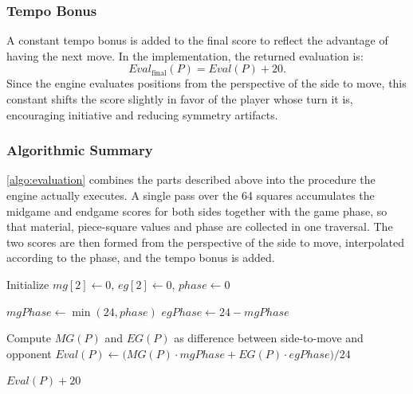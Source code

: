 \subsubsection{Tempo Bonus}
\label{subsec:tempo_bonus}

A constant tempo bonus is added to the final score to reflect the advantage of
having the next move. In the implementation, the returned evaluation is:
\[
Eval_\text{final}(P) = Eval(P) + 20.
\]
Since the engine evaluates positions from the perspective of the side to move,
this constant shifts the score slightly in favor of the player whose turn it is,
encouraging initiative and reducing symmetry artifacts.

\subsubsection{Algorithmic Summary}
\label{subsec:eval_algorithm}

\cref{algo:evaluation} combines the parts described above into the procedure the
engine actually executes. A single pass over the 64 squares accumulates the
midgame and endgame scores for both sides together with the game phase, so that
material, piece-square values and phase are collected in one traversal. The two
scores are then formed from the perspective of the side to move, interpolated
according to the phase, and the tempo bonus is added.

\begin{algorithm}[ht]
\DontPrintSemicolon
{}

Initialize $mg[2]\gets 0$, $eg[2]\gets 0$, $phase\gets 0$\;


$mgPhase \gets \min(24, phase)$\;
$egPhase \gets 24 - mgPhase$\;

Compute $MG(P)$ and $EG(P)$ as difference between side-to-move and opponent\;
$Eval(P) \gets \big(MG(P)\cdot mgPhase + EG(P)\cdot egPhase\big) / 24$\;

\Return $Eval(P) + 20$
\caption{Static evaluation with MG/EG separation, tapered interpolation, and tempo bonus.}
\label{algo:evaluation}
\end{algorithm}

